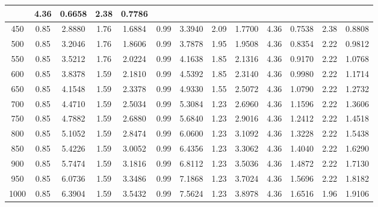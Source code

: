 \documentclass[12pt]{article}
\begin{document}
\begin{table}[ht]
{\begin{tabular}{ |c |c | c | c | c | c | c | c | c | c | c | c | c | }
      & 4.36 & 0.6658 & 2.38 & 0.7786 \\ \hline
      450
      & 0.85 & 2.8880 & 1.76 & 1.6884
      & 0.99 & 3.3940 & 2.09 & 1.7700
      & 4.36 & 0.7538 & 2.38 & 0.8808 \\ \hline
      500
      & 0.85 & 3.2046 & 1.76 & 1.8606
      & 0.99 & 3.7878 & 1.95 & 1.9508
      & 4.36 & 0.8354 & 2.22 & 0.9812 \\ \hline
      550
      & 0.85 & 3.5212 & 1.76 & 2.0224
      & 0.99 & 4.1638 & 1.85 & 2.1316
      & 4.36 & 0.9170 & 2.22 & 1.0768 \\ \hline
      600
      & 0.85 & 3.8378 & 1.59 & 2.1810
      & 0.99 & 4.5392 & 1.85 & 2.3140
      & 4.36 & 0.9980 & 2.22 & 1.1714 \\ \hline
      650
      & 0.85 & 4.1548 & 1.59 & 2.3378
      & 0.99 & 4.9330 & 1.55 & 2.5072
      & 4.36 & 1.0790 & 2.22 & 1.2732 \\ \hline
      700
      & 0.85 & 4.4710 & 1.59 & 2.5034
      & 0.99 & 5.3084 & 1.23 & 2.6960
      & 4.36 & 1.1596 & 2.22 & 1.3606 \\ \hline
      750
      & 0.85 & 4.7882 & 1.59 & 2.6880
      & 0.99 & 5.6840 & 1.23 & 2.9016
      & 4.36 & 1.2412 & 2.22 & 1.4518 \\ \hline
      800
      & 0.85 & 5.1052 & 1.59 & 2.8474
      & 0.99 & 6.0600 & 1.23 & 3.1092
      & 4.36 & 1.3228 & 2.22 & 1.5438 \\ \hline
      850
      & 0.85 & 5.4226 & 1.59 & 3.0052
      & 0.99 & 6.4356 & 1.23 & 3.3062
      & 4.36 & 1.4040 & 2.22 & 1.6290 \\ \hline
      900
      & 0.85 & 5.7474 & 1.59 & 3.1816
      & 0.99 & 6.8112 & 1.23 & 3.5036
      & 4.36 & 1.4872 & 2.22 & 1.7130 \\ \hline
      950
      & 0.85 & 6.0736 & 1.59 & 3.3486
      & 0.99 & 7.1868 & 1.23 & 3.7024
      & 4.36 & 1.5696 & 2.22 & 1.8182 \\ \hline
      1000
      & 0.85 & 6.3904 & 1.59 & 3.5432
      & 0.99 & 7.5624 & 1.23 & 3.8978
      & 4.36 & 1.6516 & 1.96 & 1.9106 \\ \hline
    \end{tabular}
  }
\end{table}
\end{document}
